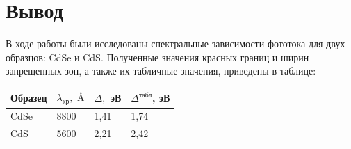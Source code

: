 \documentclass[a4paper,12pt]{article} %
\begin{document}
\section{Вывод}
В ходе работы были исследованы спектральные зависимости фототока для двух образцов: CdSe и CdS. Полученные значения красных границ и ширин запрещенных зон, а также их табличные значения, приведены в таблице:

\begin{table}[h!]
\begin{tabular}{|l|l|l|l|}
\hline
Образец & $\lambda_{\text{кр}}, \text{ \AA} $ & $\Delta,$ эВ & $\Delta^{\text{табл}}$, эВ \\ \hline
CdSe    & 8800                                & 1,41         & 1,74                       \\ \hline
CdS     & 5600                                & 2,21         & 2,42                       \\ \hline
\end{tabular}
\end{table}
\end{document}
